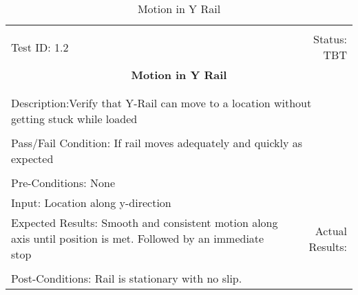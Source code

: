 \documentclass[titlepage]{article}
\begin{document}
\begin{center}%
\begin{table}[h!]
\begin{tabular}{|l r|}\hline&\\[-2mm]
	Test ID: 1.2	&Status: TBT\\[-3mm]
	\multicolumn{2}{|c|}{\textbf{\large{Motion in Y Rail}}}\\&\\\hline&\\[-3mm]
	\multicolumn{2}{|p{\textwidth}|}{Description:Verify that Y-Rail can move to a location without getting stuck while loaded}\\[1mm]\hline&\\[-3mm]
	\multicolumn{2}{|p{\textwidth}|}{Pass/Fail Condition: If rail moves adequately and quickly as expected}\\[1mm]\hline&\\[-3mm]
	\multicolumn{2}{|p{\textwidth}|}{Pre-Conditions: None}\\[4mm]
	\multicolumn{2}{|p{\textwidth}|}{Input: Location along y-direction}\\[2mm]\hline
	\multicolumn{1}{|p{0.49\textwidth}}{Expected Results: Smooth and consistent motion along axis until position is met. Followed by an immediate stop}	&\multicolumn{1}{|p{0.45\textwidth}|}{Actual Results:}\\\hline&\\[-3mm]
	\multicolumn{2}{|p{\textwidth}|}{Post-Conditions: Rail is stationary with no slip.}\\\hline
\end{tabular}
\caption{Motion in Y Rail}
\end{table}
\end{center}
\end{document}
